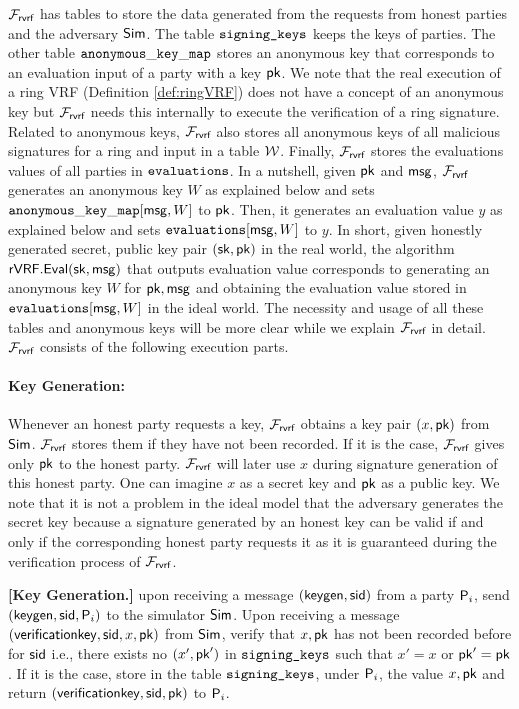 $ \mathcal{F}_{\textsf{rvrf}} $ has tables to store the data generated from the requests from honest parties and the adversary $ \mathsf{Sim} $. The table $ \texttt{signing\_keys} $  keeps the keys of parties. The other table  $ \mathtt{anonymous\_key\_map} $ stores an anonymous key that corresponds to an evaluation input  of a party with a key $ \mathsf{pk} $. We note that the real execution of a ring VRF (Definition \ref{def:ringVRF}) does not have a concept of an anonymous key but $ \mathcal{F}_{\textsf{rvrf}} $ needs this internally to execute the verification of a ring signature. Related to anonymous keys, $ \mathcal{F}_{\textsf{rvrf}} $ also stores  all  anonymous keys of all malicious  signatures  for a ring and input in a table $ \mathcal{W} $. Finally, $ \mathcal{F}_{\textsf{rvrf}} $ stores the evaluations values of all parties in $ \texttt{evaluations} $. In a nutshell,  given $ \mathsf{pk} $
and $ \mathsf{msg} $, $ \mathcal{F}_{\textsf{rvrf}} $  generates an anonymous key $ W $ as explained below and  sets $ \mathtt{anonymous\_key\_map}[\mathsf{msg},W]  $ to $ \mathsf{pk} $. Then, it generates an evaluation value $ y $ as explained below and sets $ \texttt{evaluations}[\mathsf{msg},W]  $ to $ y $. In short, given honestly generated secret, public key pair $ (\mathsf{sk},\mathsf{pk}) $ in the real world, the algorithm
$ {\mathsf{rVRF}}.{\mathsf{Eval}}(\mathsf{sk},\mathsf{msg}) $  that outputs evaluation value corresponds to generating an anonymous key $ W $ for $ \mathsf{pk}, \mathsf{msg} $ and obtaining the evaluation value stored in $ \texttt{evaluations}[\mathsf{msg},W] $ in the ideal world. The necessity and usage of all these tables and anonymous keys will be more clear while we explain $ \mathcal{F}_{\textsf{rvrf}} $ in detail. $ \mathcal{F}_{\textsf{rvrf}} $ consists of the following execution parts.



\paragraph{Key Generation:}  Whenever an honest party requests  a key, $ \mathcal{F}_{\textsf{rvrf}} $ obtains a key pair $ (x, \mathsf{pk}) $ from $ \mathsf{Sim} $. $ \mathcal{F}_{\textsf{rvrf}} $ stores them if they have not been recorded. If it is the case, $ \mathcal{F}_{\textsf{rvrf}} $ gives only $ \mathsf{pk} $ to the honest party. $ \mathcal{F}_{\textsf{rvrf}} $ will later use $ x $ during signature generation of this honest party. One can imagine $ x $ as a secret key and $ \mathsf{pk} $ as a public key. We note that it is not a problem in the ideal model that the adversary generates the secret key because a signature generated by an honest key can be valid if and only if the corresponding honest party requests it as it is guaranteed during the verification process of $ \mathcal{F}_{\textsf{rvrf}} $.

\begin{tcolorbox}[left=2pt,right=2pt]
	\textbf{[Key Generation.]} upon receiving a message $(\mathsf{keygen}, \textsf{sid})$ from a party $\mathsf{P}_i$, send $(\mathsf{keygen}, \textsf{sid}, \mathsf{P}_i)$ to the simulator $\mathsf{Sim}$.
	Upon receiving a message $(\mathsf{verificationkey}, \textsf{sid}, x,\mathsf{pk})$ from $\mathsf{Sim}$, verify that $x,\mathsf{pk}$ has not been recorded before for $ \textsf{sid} $ i.e., there exists no $ (x', \mathsf{pk}') $ in $ \texttt{signing\_keys} $ such that $ x' = x $ or $ \mathsf{pk}' = \mathsf{pk} $. If it is the case, store in the table $\texttt{signing\_keys}$, under $\mathsf{P}_i$, the value $x,\mathsf{pk}$ and return $(\mathsf{verificationkey}, \textsf{sid}, \mathsf{pk})$ to $ \mathsf{P}_i$.
\end{tcolorbox}


